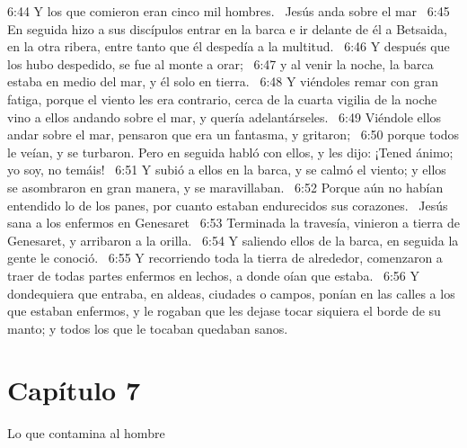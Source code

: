 6:44 Y los que comieron eran cinco mil hombres.  
Jesús anda sobre el mar   
6:45 En seguida hizo a sus discípulos entrar en la barca e ir delante de él a Betsaida, en la otra ribera, entre tanto que él despedía a la multitud.  
6:46 Y después que los hubo despedido, se fue al monte a orar;  
6:47 y al venir la noche, la barca estaba en medio del mar, y él solo en tierra.  
6:48 Y viéndoles remar con gran fatiga, porque el viento les era contrario, cerca de la cuarta vigilia de la noche vino a ellos andando sobre el mar, y quería adelantárseles.  
6:49 Viéndole ellos andar sobre el mar, pensaron que era un fantasma, y gritaron;  
6:50 porque todos le veían, y se turbaron. Pero en seguida habló con ellos, y les dijo: ¡Tened ánimo; yo soy, no temáis!  
6:51 Y subió a ellos en la barca, y se calmó el viento; y ellos se asombraron en gran manera, y se maravillaban.  
6:52 Porque aún no habían entendido lo de los panes, por cuanto estaban endurecidos sus corazones.  
Jesús sana a los enfermos en Genesaret   
6:53 Terminada la travesía, vinieron a tierra de Genesaret, y arribaron a la orilla.  
6:54 Y saliendo ellos de la barca, en seguida la gente le conoció.  
6:55 Y recorriendo toda la tierra de alrededor, comenzaron a traer de todas partes enfermos en lechos, a donde oían que estaba.  
6:56 Y dondequiera que entraba, en aldeas, ciudades o campos, ponían en las calles a los que estaban enfermos, y le rogaban que les dejase tocar siquiera el borde de su manto; y todos los que le tocaban quedaban sanos.  
\section*{Capítulo 7}
Lo que contamina al hombre   

